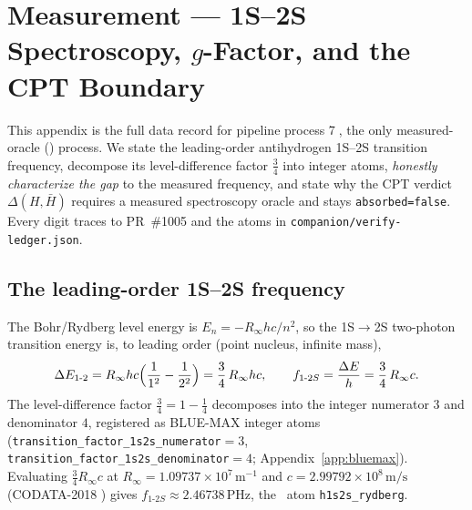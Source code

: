 \section{Measurement --- 1S--2S Spectroscopy, $g$-Factor, and the CPT Boundary}
\label{app:measurement}

This appendix is the full data record for pipeline process
\textcircled{\scriptsize 7}, the only measured-oracle (\tierOrange) process.
We state the leading-order antihydrogen 1S--2S transition frequency, decompose
its level-difference factor $\tfrac34$ into integer atoms, \emph{honestly
characterize the gap} to the measured frequency, and state why the CPT verdict
$\Delta(H,\bar H)$ requires a measured spectroscopy oracle and stays
\texttt{absorbed=false}. Every digit traces to PR~\#1005 and the atoms in
\texttt{companion/verify-ledger.json}.

\subsection{The leading-order 1S--2S frequency}
\label{app:meas-leading}

The Bohr/Rydberg level energy is $E_n=-R_\infty hc/n^2$, so the 1S$\to$2S
two-photon transition energy is, to leading order (point nucleus, infinite
mass),
\begin{equation}
\Delta E_{1\text{-}2}
= R_\infty hc\Bigl(\frac{1}{1^2}-\frac{1}{2^2}\Bigr)
= \frac{3}{4}\,R_\infty hc,
\qquad
f_{1\text{-}2S} = \frac{\Delta E}{h} = \frac{3}{4}\,R_\infty c .
\label{eq:meas-lead}
\end{equation}
The level-difference factor $\tfrac34=1-\tfrac14$ decomposes into the integer
numerator $3$ and denominator $4$, registered as BLUE-MAX integer atoms
(\verb|transition_factor_1s2s_numerator|$=3$,
\verb|transition_factor_1s2s_denominator|$=4$; Appendix~\ref{app:bluemax}).
Evaluating $\tfrac34 R_\infty c$ at $R_\infty=1.09737\times10^7\,\mathrm{m}^{-1}$
and $c=2.99792\times10^8\,\mathrm{m/s}$ (CODATA-2018 \citep{mohr2018codata})
gives $f_{1\text{-}2S}\approx2.46738$\,PHz, the \tierGreen\ atom
\verb|h1s2s_rydberg|.

